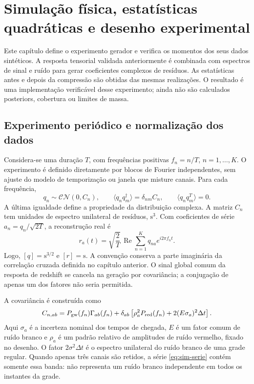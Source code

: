 \chapter[Simulação e desenho experimental]{Simulação física, estatísticas quadráticas e desenho experimental}
\label{chap:simulacao}

Este capítulo define o experimento gerador e verifica os momentos dos
seus dados sintéticos. A resposta tensorial validada anteriormente é
combinada com espectros de sinal e ruído para gerar coeficientes complexos
de resíduos. As estatísticas antes e depois da compressão são obtidas das
mesmas realizações. O resultado é uma implementação verificável
desse experimento; ainda não são calculados posteriors, cobertura ou
limites de massa.

\section{Experimento periódico e normalização dos dados}

Considera-se uma duração \(T\), com frequências positivas
\(f_n=n/T\), \(n=1,\ldots,K\). O experimento é definido diretamente
por blocos de Fourier independentes, sem ajuste do modelo de temporização
ou janela que misture canais. Para cada frequência,
\begin{equation}
 q_n\sim\mathcal{CN}(0,C_n),\qquad
 \langle q_nq_m^\dagger\rangle=\delta_{nm}C_n,\qquad
 \langle q_nq_m^T\rangle=0.
 \label{eq:sim-cn}
\end{equation}
A última igualdade define a propriedade da distribuição complexa. A
matriz \(C_n\) tem unidades de espectro unilateral de resíduos,
\(\mathrm{s}^3\). Com coeficientes de série
\(a_n=q_n/\sqrt{2T}\), a reconstrução real é
\begin{equation}
 r_a(t)=\sqrt{\frac2T}\,\operatorname{Re}
       \sum_{n=1}^{K}q_{na}e^{i2\pi f_nt}.
 \label{eq:sim-serie}
\end{equation}
Logo, \([q]=\mathrm{s}^{3/2}\) e \([r]=\mathrm{s}\).
A convenção conserva a parte imaginária da correlação cruzada definida
no capítulo anterior. O sinal global comum da resposta de redshift se
cancela na geração por covariância; a conjugação de apenas um dos fatores
não seria permitida.

A covariância é construída como
\begin{equation}
 C_{n,ab}=P_{\rm gw}(f_n)\Gamma_{ab}(f_n)
 +\delta_{ab}\left[
       \rho_a^2P_{\rm red}(f_n)
       +2(E\sigma_a)^2\Delta t\right].
 \label{eq:sim-covariancia}
\end{equation}
Aqui \(\sigma_a\) é a incerteza nominal dos tempos de chegada,
\(E\) é um fator comum de ruído branco e \(\rho_a\) é um padrão
relativo de amplitudes de ruído vermelho, fixado no desenho. O fator
\(2\sigma^2\Delta t\) é o espectro unilateral do ruído branco de uma
grade regular. Quando apenas três canais são retidos, a série
\eqref{eq:sim-serie} contém somente essa banda: não representa um ruído
branco independente em todos os instantes da grade.

